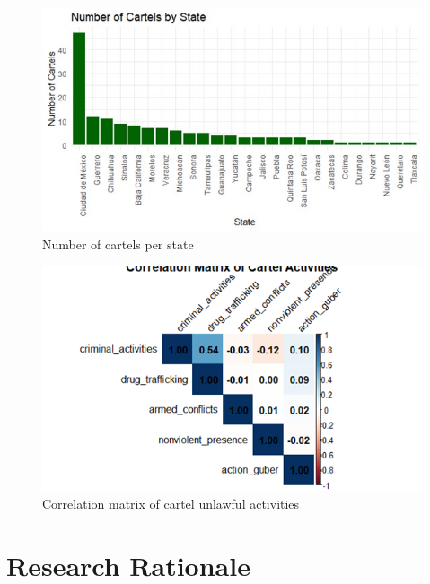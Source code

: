 \documentclass[
]{article}
\begin{document}
\begin{figure}[H]

{\centering \includegraphics{Figures/Figure1.jpg}

}

\caption{Number of cartels per state}

\end{figure}%
\begin{figure}[H]

{\centering \includegraphics{Figures/Figure2.png}

}

\caption{Correlation matrix of cartel unlawful activities}

\end{figure}%

\section{Research Rationale}\label{research-rationale}
\end{document}
